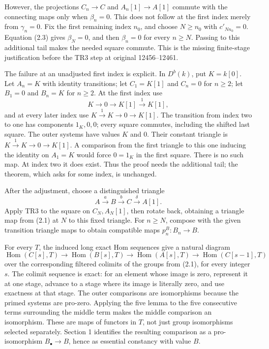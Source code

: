 \documentclass[11pt]{article}
\begin{document}
However,\allowbreak{} the projections \(C_n\to C\) and \(A_n[1]\to A[1]\) commute with the connecting maps only when \(\beta_n=0\). This does not follow at the first index merely from \(\gamma_n=0\). Fix the first remaining index \(n_0\),\allowbreak{} and choose \(N\geq n_0\) with \(c'_{N n_0}=0\). Equation (2.3)\allowbreak{} gives \(\beta_N=0\),\allowbreak{} and then \(\beta_n=0\) for every \(n\geq N\). Passing to this additional tail makes the needed square commute. This is the missing finite-stage justification before the TR3 step at original 12456–\allowbreak{}12461.

The failure at an unadjusted first index is explicit. In \(D^b(k)\),\allowbreak{} put \(K=k[0]\). Let \(A_n=K\) with identity transitions; let \(C_1=K[1]\) and \(C_n=0\) for \(n\geq2\); let \(B_1=0\) and \(B_n=K\) for \(n\geq2\). At the first index use \[
K\longrightarrow0\longrightarrow K[1]\xrightarrow{1}K[1],
\] and at every later index use \(K\xrightarrow{1}K\to0\to K[1]\). The transition from index two to one has components \(1_K,0,0\); every square commutes,\allowbreak{} including the shifted last square. The outer systems have values \(K\) and \(0\). Their constant triangle is \(K\xrightarrow{1}K\to0\to K[1]\). A comparison from the first triangle to this one inducing the identity on \(A_1=K\) would force \(0=1_K\) in the first square. There is no such map. At index two it does exist. Thus the proof needs the additional tail; the theorem,\allowbreak{} which asks for some index,\allowbreak{} is unchanged.

After the adjustment,\allowbreak{} choose a distinguished triangle \[
A\xrightarrow{a}B\xrightarrow{b}C\xrightarrow{\delta}A[1].
\] Apply TR3 to the square on \(C_N,A_N[1]\),\allowbreak{} then rotate back,\allowbreak{} obtaining a triangle map from (2.1)\allowbreak{} at \(N\) to this fixed triangle. For \(n\geq N\),\allowbreak{} compose with the given transition triangle maps to obtain compatible maps \(p^B_n:B_n\to B\).

For every \(T\),\allowbreak{} the induced long exact Hom sequences give a natural diagram \[
\operatorname{Hom}(C[s],T)\to\operatorname{Hom}(B[s],T)
 \to\operatorname{Hom}(A[s],T)\to\operatorname{Hom}(C[s-1],T)
\] over the corresponding filtered colimits of the groups from (2.1)\allowbreak{},\allowbreak{} for every integer \(s\). The colimit sequence is exact:\allowbreak{} for an element whose image is zero,\allowbreak{} represent it at one stage,\allowbreak{} advance to a stage where its image is literally zero,\allowbreak{} and use exactness at that stage. The outer comparisons are isomorphisms because the primed systems are pro-zero. Applying the five lemma to the five consecutive terms surrounding the middle term makes the middle comparison an isomorphism. These are maps of functors in \(T\),\allowbreak{} not just group isomorphisms selected separately. Section 1 identifies the resulting comparison as a pro-isomorphism \(B_\bullet\to B\),\allowbreak{} hence as essential constancy with value \(B\).
\end{document}
